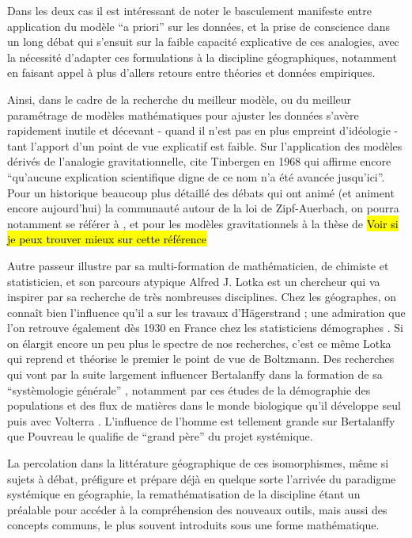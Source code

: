 Dans les deux cas il est intéressant de noter le basculement manifeste entre application du modèle \foreignquote{latin}{a priori} sur les données, et la prise de conscience dans un long débat qui s'ensuit sur la faible capacité explicative de ces analogies, avec la nécessité d'adapter ces formulations à la discipline géographiques, notamment en faisant appel à plus d'allers retours entre théories et données empiriques. 

Ainsi, dans le cadre de la recherche du meilleur modèle, ou du meilleur paramétrage de modèles mathématiques pour ajuster les données s'avère rapidement inutile et décevant - quand il n'est pas en plus empreint d'idéologie - tant l'apport d'un point de vue explicatif est faible. Sur l'application des modèles dérivés de l'analogie gravitationnelle, \textcite[37]{Pumain1982} cite Tinbergen en 1968 qui affirme encore \enquote{qu'aucune explication scientifique digne de ce nom n'a été avancée jusqu'ici}. Pour un historique beaucoup plus détaillé des débats qui ont animé (et animent encore aujourd'hui) la communauté autour de la loi de Zipf-Auerbach, on pourra notamment se référer à \textcite{Pumain1982,Pumain2012}, et pour les modèles gravitationnels à la thèse de \autocite{JensenButler1970} \hl{Voir si je peux trouver mieux sur cette référence}

Autre passeur illustre par sa multi-formation de mathématicien, de chimiste et statisticien, et son parcours atypique Alfred J. Lotka est un chercheur qui va inspirer par sa recherche de très nombreuses disciplines. Chez les géographes, on connaît bien l'influence qu'il a sur les travaux d'Hägerstrand \autocite[95]{Claval2007}; une admiration que l'on retrouve également dès 1930 en France chez les statisticiens démographes \autocite{Veron2009}. Si on élargit encore un peu plus le spectre de nos recherches, c'est ce même Lotka qui reprend et théorise le premier le point de vue de Boltzmann. Des recherches qui vont par la suite largement influencer Bertalanffy dans la formation de sa \enquote{systèmologie générale} \autocite[178]{Pouvreau2013}, notamment par ces études de la démographie des populations et des flux de matières dans le monde biologique qu'il développe seul puis avec Volterra \autocite[545-546]{Pouvreau2013}. L'influence de l'homme est tellement grande sur Bertalanffy que Pouvreau le qualifie de \enquote{grand père} du projet systémique.

La percolation dans la littérature géographique de ces isomorphismes, même si sujets à débat, préfigure et prépare déjà en quelque sorte l'arrivée du paradigme systémique en géographie, la remathématisation de la discipline étant un préalable pour accéder à la compréhension des nouveaux outils, mais aussi des concepts communs, le plus souvent introduits sous une forme mathématique. \autocite[432]{Ackerman1963}

